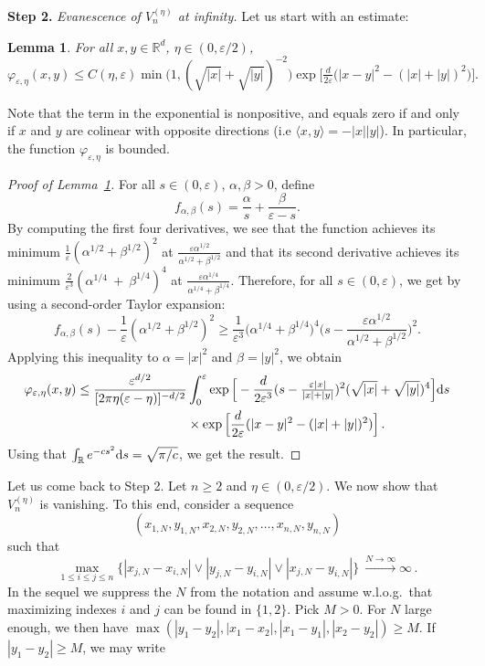 \documentclass[a4paper,11pt]{amsart}
\numberwithin{equation}{section}
\newtheorem{lemma}[theorem]{Lemma}
\newcommand{\bbR}{{\ensuremath{\mathbb R}} }
\newcommand{\ga}{\alpha}
\newcommand{\gb}{\beta}
\newcommand{\gep}{\varepsilon}
\newcommand{\dd}{\text{\rm d}}             %
\newcommand{\8}{\infty}
\newcommand{\beq}{\begin{equation}}
\newcommand{\eeq}{\end{equation}}
\newcommand{\ba}{\begin{aligned}}
\newcommand{\ea}{\end{aligned}}
\begin{document}
{\bf \noindent Step 2.} {\it Evanescence of $V_n^{(\eta)}$ at infinity.} Let us start with an estimate:
\begin{lemma}\label{lem:uniformvarphi} For all $x,y\in\bbR^d$, $\eta\in (0,\gep/2)$,
\beq
\varphi_{\gep,\eta}(x,y) \le C(\eta,\gep)\min\Big(1,(\sqrt{|x|}+\sqrt{|y|})^{-2}\Big)
\exp\Big[\tfrac{ d}{2\gep}\Big(|x-y|^2 - (|x|+|y|)^2\Big)\Big].
\eeq
\end{lemma}
%
Note that the term in the exponential is nonpositive, and equals zero if and only if $x$ and $y$ are colinear with opposite directions (i.e $\langle x,y\rangle = -|x||y|$). In particular, the function $\varphi_{\gep,\eta}$ is bounded.
\begin{proof}[Proof of Lemma~\ref{lem:uniformvarphi}]
For all $s\in (0,\gep)$, $\ga,\gb>0$, define
\beq
f_{\ga,\gb}(s) = \frac{\ga}{s} + \frac{\gb}{\gep-s}.
\eeq
By computing the first four derivatives, we see that the function achieves its minimum $\tfrac{1}{\gep}(\ga^{1/2}+ \gb^{1/2})^2$ at $\frac{\gep\ga^{1/2}}{\ga^{1/2}+ \gb^{1/2}}$ and that its second derivative achieves its minimum $\tfrac{2}{\gep^3}(\ga^{1/4}~+~ \gb^{1/4})^4$ at $\frac{\gep\ga^{1/4}}{\ga^{1/4}+ \gb^{1/4}}$. Therefore, for all $s\in(0,\gep)$,  we get by using a second-order Taylor expansion:
\beq
f_{\ga,\gb}(s) - \frac{1}{\gep}(\ga^{1/2}+ \gb^{1/2})^2 \ge  \frac{1}{\gep^3}\Big(\ga^{1/4}+ \gb^{1/4} \Big)^4 \Big(s - \frac{\gep\ga^{1/2}}{\ga^{1/2}+ \gb^{1/2}}\Big)^2.
\eeq
Applying this inequality to $\ga = |x|^2$ and $\gb = |y|^2$, we obtain
%
\beq
\ba
\varphi_{\gep,\eta}(x,y)
 \le \frac{\gep^{d/2}}{[2\pi\eta(\gep-\eta)]^{-d/2}} &\int_0^\gep\exp\Big[-\frac{ d}{2\gep^3}(s - \tfrac{\gep|x|}{|x|+|y|})^2(\sqrt{|x|}+\sqrt{|y|})^4\Big]\dd s\\
& \times\exp\Big[\frac{ d}{2\gep}(|x-y|^2-(|x|+|y|)^2)\Big]\,.
\ea
\eeq
%
Using that $\int_{\bbR} e^{-cs^2}\dd s = \sqrt{\pi/c}$, we get the result.
\end{proof}
%
Let us come back to Step 2. Let $n\ge 2$ and $\eta\in (0, \gep/2)$. We now show that $V_n^{(\eta)}$ is vanishing. To this end, consider a sequence
\beq
(x_{1,N},y_{1,N},x_{2,N},y_{2,N},\ldots, x_{n,N},y_{n,N})
\eeq
such that 
\begin{equation}\label{eq:maxinf}
	\max_{1\leq i \le j\leq n}\big\{|x_{j,N}-x_{i,N}|\vee |y_{j,N}-y_{i,N}|\vee |x_{j,N}-y_{i,N}|\big\}\ \stackrel{N\to\infty}{\longrightarrow}\infty\,.
\end{equation}
In the sequel we suppress the $N$ from the notation and assume w.l.o.g.\ that maximizing indexes $i$ and $j$ can be found in $\{1,2\}$. Pick $M>0$. For $N$ large enough,  we then have $\max(|y_1- y_2|,|x_1-x_2|,|x_1-y_1|,|x_2-y_2|)\ge M$. If $|y_1-y_2|\ge M$, we may write
\end{document}
